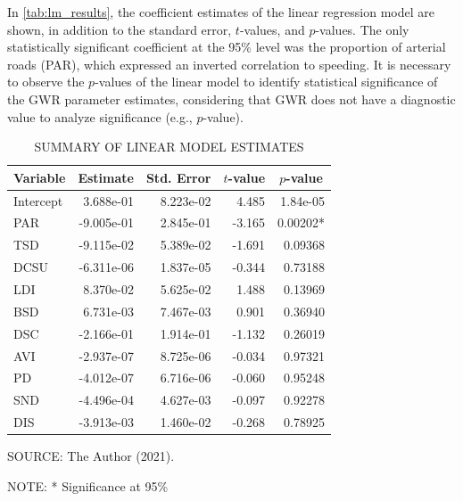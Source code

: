 In \autoref{tab:lm_results}, the coefficient estimates of the linear regression model are shown, in addition to the standard error, $t$-values, and $p$-values. The only statistically significant coefficient at the 95\% level was the proportion of arterial roads (PAR), which expressed an inverted correlation to speeding. It is necessary to observe the $p$-values of the linear model to identify statistical significance of the GWR parameter estimates, considering that GWR does not have a diagnostic value to analyze significance (e.g., $p$-value). 


\begin{table}[!htbp]
    \footnotesize
    \captionsetup{justification=raggedright,
        singlelinecheck=false,
        font=footnotesize}
    \caption{SUMMARY OF LINEAR MODEL ESTIMATES}
    \centering
    \begin{tabular}{lrrrr}
        \hline
        \multicolumn{1}{c}{\textbf{Variable}} & \multicolumn{1}{c}{\textbf{Estimate}} & \multicolumn{1}{c}{\textbf{Std. Error}} & \multicolumn{1}{c}{\textbf{$t$-value}} & \multicolumn{1}{c}{\textbf{$p$-value}}  \\
        \hline
        Intercept & 3.688e-01  & 8.223e-02 & 4.485  & 1.84e-05 \\ 
        PAR       & -9.005e-01 & 2.845e-01 & -3.165 & 0.00202* \\ 
        TSD       & -9.115e-02 & 5.389e-02 & -1.691 & 0.09368  \\ 
        DCSU      & -6.311e-06 & 1.837e-05 & -0.344 & 0.73188  \\ 
        LDI       & 8.370e-02  & 5.625e-02 & 1.488  & 0.13969  \\ 
        BSD       & 6.731e-03  & 7.467e-03 & 0.901  & 0.36940  \\ 
        DSC       & -2.166e-01 & 1.914e-01 & -1.132 & 0.26019  \\ 
        AVI       & -2.937e-07 & 8.725e-06 & -0.034 & 0.97321  \\ 
        PD        & -4.012e-07 & 6.716e-06 & -0.060 & 0.95248  \\ 
        SND       & -4.496e-04 & 4.627e-03 & -0.097 & 0.92278  \\ 
        DIS       & -3.913e-03 & 1.460e-02 & -0.268 & 0.78925  \\
        \hline
    \end{tabular}
    \label{tab:lm_results}
    \par \vspace{2mm} \footnotesize \raggedright
    SOURCE: The Author (2021).
    \par 
    NOTE: * Significance at 95\%
\end{table}

